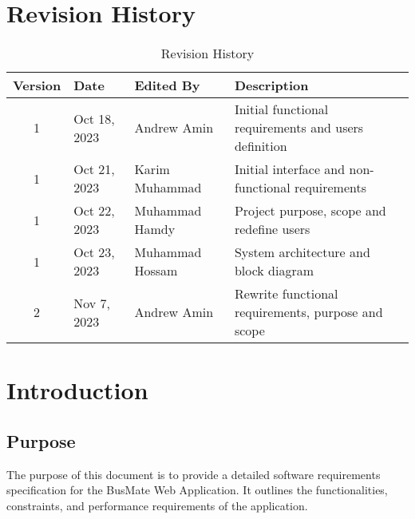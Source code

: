 \documentclass{BusMateSRS}
\def\projectName{BusMate}
\def\nameAndrew{Andrew Amin}
\def\nameKarim{Karim Muhammad}
\def\nameHamdy{Muhammad Hamdy}
\def\nameHossam{Muhammad Hossam}
\begin{document}
\maketitle
\tableofcontents
\listoffigures
\listoftables

\chapter*{Revision History}
\begin{table}[ht]
  \centering
  \begin{tabularx}{\textwidth}{|c|l|l|X|}
    \hline
    \textbf{Version} & \textbf{Date} & \textbf{Edited By} & \textbf{Description} \\
    \hline
    1 & Oct 18, 2023 & \nameAndrew & 
    Initial functional requirements and users definition \\
    \hline
    1 & Oct 21, 2023 & \nameKarim & 
    Initial interface and non-functional requirements \\
    \hline
    1 & Oct 22, 2023 & \nameHamdy &
    Project purpose, scope and redefine users \\
    \hline
    1 & Oct 23, 2023 & \nameHossam &
    System architecture and block diagram \\
    \hline
    2 & Nov 7, 2023 & \nameAndrew & 
    Rewrite functional requirements, purpose and scope \\
    \hline
  \end{tabularx}
  \caption{Revision History}
  \label{tab:revision-history}
\end{table}


\chapter{Introduction}
\section{Purpose}
The purpose of this document is to provide a detailed software requirements 
specification for the {\projectName} Web Application. 
It outlines the functionalities, constraints, and performance requirements 
of the application.
\end{document}
